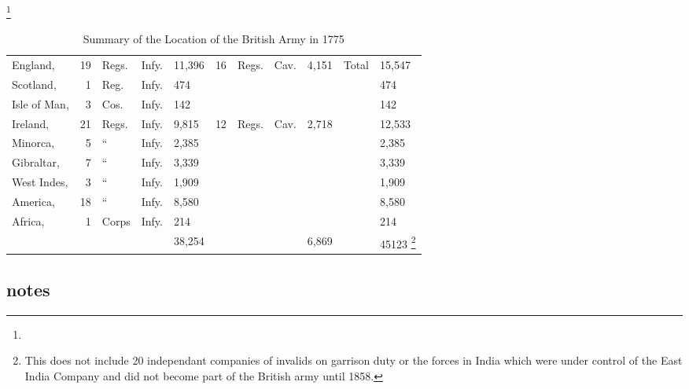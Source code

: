 \footnote{}


\begin{table}[h!]
\begin{center}
\small
\caption{Summary of the Location of the British Army in 1775}
\begin{tabular}{lrlcllcclcl}
  England,	& 19	& Regs.	& Infy.	& 11,396&16	& Regs.	& Cav.	& 4,151 & Total	&15,547 \\
  Scotland,	& 1	& Reg.	& Infy.	& 474	&	&	&	&	&	&474	\\
  Isle of Man,	& 3	& Cos.	& Infy.	& 142	&	&	&	&	&	&142	\\
  Ireland,	& 21	& Regs.	& Infy.	& 9,815	&12	& Regs.	& Cav.	& 2,718	&	&12,533	\\
  Minorca,	& 5	&`` 	& Infy.	& 2,385	&	&	&	&	&	&2,385	\\
  Gibraltar,	& 7	&``	& Infy.	& 3,339	&	&	&	&	&	&3,339	\\
  West Indes,	& 3	&``	& Infy.	& 1,909	&	&	&	&	&	&1,909	\\
  America,	& 18	&``	& Infy.	& 8,580	&	&	&	&	&	&8,580	\\
  Africa,	& 1	& Corps	& Infy.	& 214	&	&	&	&	&	&214 \\\bottomrule
  		&	&	&	& 38,254&	&	&	& 6,869 &	&45123
\footnote{This does not include 20 independant companies of invalids on garrison duty or the forces in
India which were under control of the East India Company and did not become part of the British
army until 1858.\cite[3]{curtis_org_1972}}\\
\end{tabular}
\end{center}
\end{table}


\subsection{notes}


